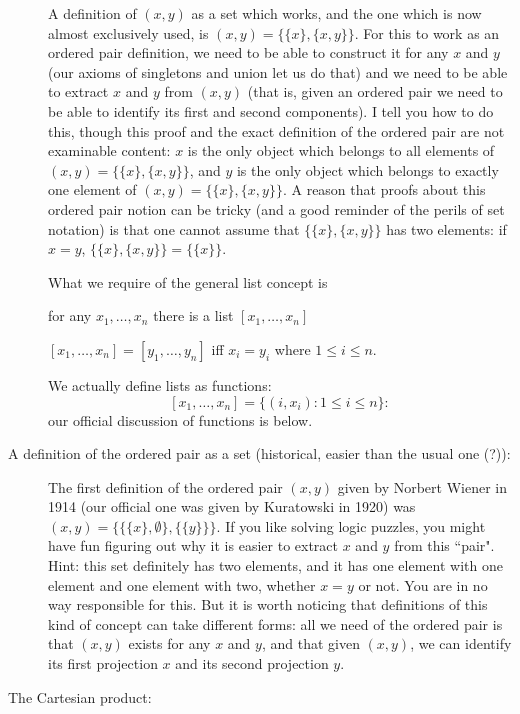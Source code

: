 \documentclass[12pt]{article}
\begin{document}
\begin{description}
A definition of $(x,y)$ as a set which works, and the one which is now almost exclusively used, is $(x,y) = \{\{x\},\{x,y\}\}$.  For this to work as an ordered pair definition, we
need to be able to construct it for any $x$ and $y$ (our axioms of singletons and union let us do that) and we need to be able to extract $x$ and $y$ from $(x,y)$ (that is, given an ordered pair we need to be able to identify its first and second components).  I tell you how to do this, though this proof and the exact definition of the ordered pair are not examinable content:  $x$ is the only object which belongs to all  elements of $(x,y) = \{\{x\},\{x,y\}\}$, and
$y$ is the only object which belongs to exactly one element of $(x,y) = \{\{x\},\{x,y\}\}$.  A reason that proofs about this ordered pair notion can be tricky (and a good reminder of the perils of set notation) is that one cannot assume that $\{\{x\},\{x,y\}\}$ has two elements:  if $x=y$, $\{\{x\},\{x,y\}\}= \{\{x\}\}$.

What we require of the general list concept is

for any $x_1,\ldots,x_n$ there is a list $[x_1,\ldots,x_n]$

$[x_1,\ldots,x_n] = [y_1,\ldots,y_n]$ iff $x_i = y_i$ where $1 \leq i \leq n$.

We actually define lists as functions:  $$[x_1,\ldots,x_n] = \{(i,x_i):1 \leq i \leq n\}:$$ our official discussion of functions is below.

\item[A definition of the ordered pair as a set (historical, easier than the usual one (?)):]

The first definition of the ordered pair $(x,y)$ given by Norbert Wiener in 1914 (our official one was given by Kuratowski in 1920) was $(x,y) = \{\{\{x\},\emptyset\},\{\{y\}\}\}$.  If you like solving logic puzzles, you might have fun figuring out why it is easier to extract $x$ and $y$ from this ``pair".  Hint:  this set definitely has two elements, and it has one element with one element and one element with two, whether $x=y$ or not.  You are in no way responsible for this.  But it is worth noticing that definitions of this kind of concept can take different forms:  all we need of the ordered pair is that $(x,y)$ exists for any $x$ and $y$, and that given $(x,y)$, we can identify its first projection $x$ and its second projection $y$.



\item[The Cartesian product:]


\end{description}
\end{document}
